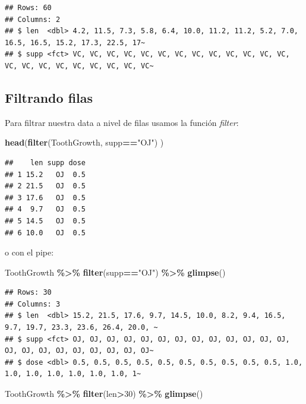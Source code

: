 \documentclass[
]{book}
\newenvironment{Shaded}{\begin{snugshade}}{\end{snugshade}}
\newcommand{\DecValTok}[1]{\textcolor[rgb]{0.00,0.00,0.81}{#1}}
\newcommand{\FunctionTok}[1]{\textcolor[rgb]{0.13,0.29,0.53}{\textbf{#1}}}
\newcommand{\NormalTok}[1]{#1}
\newcommand{\SpecialCharTok}[1]{\textcolor[rgb]{0.81,0.36,0.00}{\textbf{#1}}}
\newcommand{\StringTok}[1]{\textcolor[rgb]{0.31,0.60,0.02}{#1}}
\begin{document}
\begin{verbatim}
## Rows: 60
## Columns: 2
## $ len  <dbl> 4.2, 11.5, 7.3, 5.8, 6.4, 10.0, 11.2, 11.2, 5.2, 7.0, 16.5, 16.5, 15.2, 17.3, 22.5, 17~
## $ supp <fct> VC, VC, VC, VC, VC, VC, VC, VC, VC, VC, VC, VC, VC, VC, VC, VC, VC, VC, VC, VC, VC, VC~
\end{verbatim}

\subsection{Filtrando filas}\label{filtrando-filas-1}

Para filtrar nuestra data a nivel de filas usamos la función \emph{filter}:

\begin{Shaded}
\begin{Highlighting}[]
\FunctionTok{head}\NormalTok{(}\FunctionTok{filter}\NormalTok{(ToothGrowth, supp}\SpecialCharTok{==}\StringTok{"OJ"}\NormalTok{) )}
\end{Highlighting}
\end{Shaded}

\begin{verbatim}
##    len supp dose
## 1 15.2   OJ  0.5
## 2 21.5   OJ  0.5
## 3 17.6   OJ  0.5
## 4  9.7   OJ  0.5
## 5 14.5   OJ  0.5
## 6 10.0   OJ  0.5
\end{verbatim}

o con el pipe:

\begin{Shaded}
\begin{Highlighting}[]
\NormalTok{ToothGrowth }\SpecialCharTok{\%\textgreater{}\%} \FunctionTok{filter}\NormalTok{(supp}\SpecialCharTok{==}\StringTok{"OJ"}\NormalTok{) }\SpecialCharTok{\%\textgreater{}\%} \FunctionTok{glimpse}\NormalTok{()}
\end{Highlighting}
\end{Shaded}

\begin{verbatim}
## Rows: 30
## Columns: 3
## $ len  <dbl> 15.2, 21.5, 17.6, 9.7, 14.5, 10.0, 8.2, 9.4, 16.5, 9.7, 19.7, 23.3, 23.6, 26.4, 20.0, ~
## $ supp <fct> OJ, OJ, OJ, OJ, OJ, OJ, OJ, OJ, OJ, OJ, OJ, OJ, OJ, OJ, OJ, OJ, OJ, OJ, OJ, OJ, OJ, OJ~
## $ dose <dbl> 0.5, 0.5, 0.5, 0.5, 0.5, 0.5, 0.5, 0.5, 0.5, 0.5, 1.0, 1.0, 1.0, 1.0, 1.0, 1.0, 1.0, 1~
\end{verbatim}

\begin{Shaded}
\begin{Highlighting}[]
\NormalTok{ToothGrowth }\SpecialCharTok{\%\textgreater{}\%} \FunctionTok{filter}\NormalTok{(len}\SpecialCharTok{\textgreater{}}\DecValTok{30}\NormalTok{) }\SpecialCharTok{\%\textgreater{}\%} \FunctionTok{glimpse}\NormalTok{()}
\end{Highlighting}
\end{Shaded}
\end{document}
